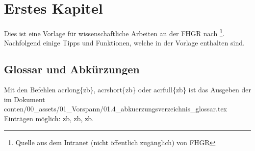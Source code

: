 \chapter{Erstes Kapitel}
\label{kap:eins}
Dies ist eine Vorlage für wissenschaftliche Arbeiten an der FHGR nach \textcite{stepanenko_leitfaden_2023}\footnote{Quelle aus dem Intranet (nicht öffentlich zugänglich) von FHGR}. Nachfolgend einige Tipps und Funktionen, welche in der Vorlage enthalten sind.

\section{Glossar und Abkürzungen}
Mit den Befehlen \setminus acrlong\{zb\}, \setminus acrshort\{zb\} oder \setminus acrfull\{zb\} ist das Ausgeben der im Dokument conten/00\_assets/01\_Vorspann/01.4\_abkuerzungsverzeichnis\_glossar.tex Einträgen möglich: \acrshort{zb}, \acrshort{zb}, \acrfull{zb}.


